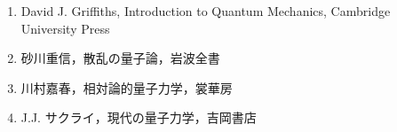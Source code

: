 \documentclass{report}
\begin{document}
  \begin{enumerate}
    \item David J. Griffiths, Introduction to Quantum Mechanics, Cambridge University Press
    \item 砂川重信，散乱の量子論，岩波全書
    \item 川村嘉春，相対論的量子力学，裳華房
    \item J.J. サクライ，現代の量子力学，吉岡書店
  \end{enumerate}
\end{document}
